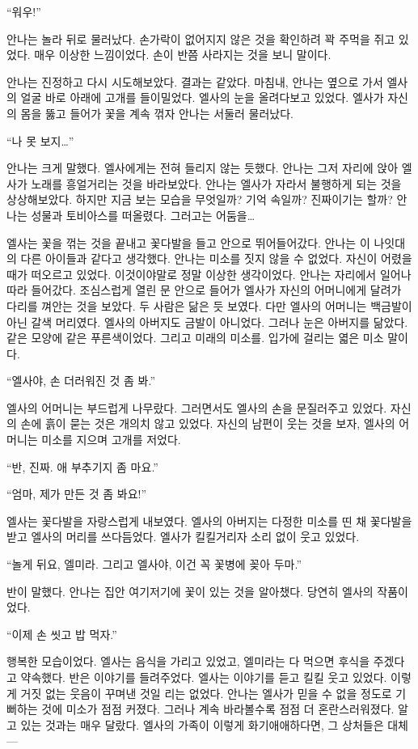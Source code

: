 ``워우!''

안나는 놀라 뒤로 물러났다. 손가락이 없어지지 않은 것을 확인하려 꽉 주먹을 쥐고 있었다. 매우 이상한 느낌이었다. 손이 반쯤 사라지는 것을 보니 말이다.

안나는 진정하고 다시 시도해보았다. 결과는 같았다. 마침내, 안나는 옆으로 가서 엘사의 얼굴 바로 아래에 고개를 들이밀었다. 엘사의 눈을 올려다보고 있었다. 엘사가 자신의 몸을 뚫고 들어가 꽃을 계속 꺾자 안나는 서둘러 물러났다.

``나 못 보지\ldots''

안나는 크게 말했다. 엘사에게는 전혀 들리지 않는 듯했다. 안나는 그저 자리에 앉아 엘사가 노래를 흥얼거리는 것을 바라보았다. 안나는 엘사가 자라서 불행하게 되는 것을 상상해보았다. 하지만 지금 보는 모습을 무엇일까? 기억 속일까? 진짜이기는 할까? 안나는 성물과 토비아스를 떠올렸다. 그러고는 어둠을\ldots

엘사는 꽃을 꺾는 것을 끝내고 꽃다발을 들고 안으로 뛰어들어갔다. 안나는 이 나잇대의 다른 아이들과 같다고 생각했다. 안나는 미소를 짓지 않을 수 없었다. 자신이 어렸을 때가 떠오르고 있었다. 이것이야말로 정말 이상한 생각이었다. 안나는 자리에서 일어나 따라 들어갔다. 조심스럽게 열린 문 안으로 들어가 엘사가 자신의 어머니에게 달려가 다리를 껴안는 것을 보았다. 두 사람은 닮은 듯 보였다. 다만 엘사의 어머니는 백금발이 아닌 갈색 머리였다. 엘사의 아버지도 금발이 아니었다. 그러나 눈은 아버지를 닮았다. 같은 모양에 같은 푸른색이었다. 그리고 미래의 미소를. 입가에 걸리는 엷은 미소 말이다.

``엘사야, 손 더러워진 것 좀 봐.''

엘사의 어머니는 부드럽게 나무랐다. 그러면서도 엘사의 손을 문질러주고 있었다. 자신의 손에 흙이 묻는 것은 개의치 않고 있었다. 자신의 남편이 웃는 것을 보자, 엘사의 어머니는 미소를 지으며 고개를 저었다.

``반, 진짜. 애 부추기지 좀 마요.''

``엄마, 제가 만든 것 좀 봐요!''

엘사는 꽃다발을 자랑스럽게 내보였다. 엘사의 아버지는 다정한 미소를 띤 채 꽃다발을 받고 엘사의 머리를 쓰다듬었다. 엘사가 킬킬거리자 소리 없이 웃고 있었다.

``놀게 뒤요, 엘미라. 그리고 엘사야, 이건 꼭 꽃병에 꽂아 두마.''

반이 말했다. 안나는 집안 여기저기에 꽃이 있는 것을 알아챘다. 당연히 엘사의 작품이었다.

``이제 손 씻고 밥 먹자.''

행복한 모습이었다. 엘사는 음식을 가리고 있었고, 엘미라는 다 먹으면 후식을 주겠다고 약속했다. 반은 이야기를 들려주었다. 엘사는 이야기를 듣고 킬킬 웃고 있었다. 이렇게 거짓 없는 웃음이 꾸며낸 것일 리는 없었다. 안나는 엘사가 믿을 수 없을 정도로 기뻐하는 것에 미소가 점점 커졌다. 그러나 계속 바라볼수록 점점 더 혼란스러워졌다. 알고 있는 것과는 매우 달랐다. 엘사의 가족이 이렇게 화기애애하다면, 그 상처들은 대체—


